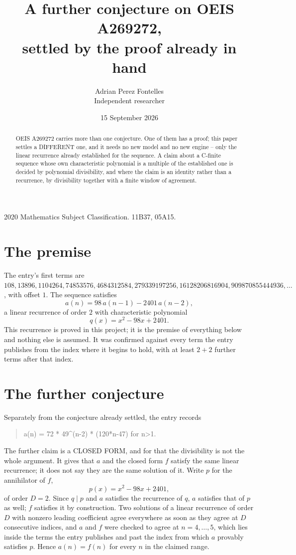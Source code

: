\documentclass[11pt,a4paper]{article}
\title{A further conjecture on OEIS A269272,\\ \large settled by the proof already in hand}
\author{Adrian Perez Fontelles\\ \small Independent researcher}
\date{15 September 2026}
\theoremstyle{plain}
\theoremstyle{definition}
\begin{document}
\maketitle

\begin{abstract}
OEIS A269272 carries more than one conjecture. One of them has a proof; this paper settles a
DIFFERENT one, and it needs no new model and no new engine -- only the linear recurrence already
established for the sequence. A claim about a C-finite sequence whose own characteristic
polynomial is a multiple of the established one is decided by polynomial divisibility, and where
the claim is an identity rather than a recurrence, by divisibility together with a finite window
of agreement.
\end{abstract}

\noindent\small 2020 Mathematics Subject Classification. 11B37, 05A15.\normalsize

\section{The premise}

The entry's first terms are $108, 13896, 1104264, 74853576, 4684312584, 279339197256, 16128206816904, 909870855444936,\dots$, with offset $1$. The sequence satisfies
\[
  a(n)=98\,a(n-1) - 2401\,a(n-2) ,
\]
a linear recurrence of order $2$ with characteristic polynomial
\[
  q(x)=x^{2} - 98 x + 2401 .
\]
This recurrence is proved in this project; it is the premise of everything below and nothing else is assumed.
It was confirmed against every term the entry publishes from the index where it begins to hold,
with at least $2+2$ further terms after that index.

\section{The further conjecture}

Separately from the conjecture already settled, the entry records

\begin{quote}\raggedright a(n) = 72 * 49\^{}(n-2) * (120*n-47) for n>1.\end{quote}

The further claim is a CLOSED FORM, and for that the divisibility is not the whole argument. It
gives that $a$ and the closed form $f$ satisfy the same linear recurrence; it does not say they
are the same solution of it. Write $p$ for the annihilator of $f$,
\[
  p(x)=x^{2} - 98 x + 2401 ,
\]
of order $D=2$. Since $q\mid p$ and $a$ satisfies the recurrence of $q$, $a$ satisfies that of
$p$ as well; $f$ satisfies it by construction. Two solutions of a linear recurrence of order $D$
with nonzero leading coefficient agree everywhere as soon as they agree at $D$ consecutive
indices, and $a$ and $f$ were checked to agree at $n=4,\dots,5$,
which lies inside the terms the entry publishes and past the index from which $a$ provably
satisfies $p$. Hence $a(n)=f(n)$ for every $n$ in the claimed range.
\end{document}
